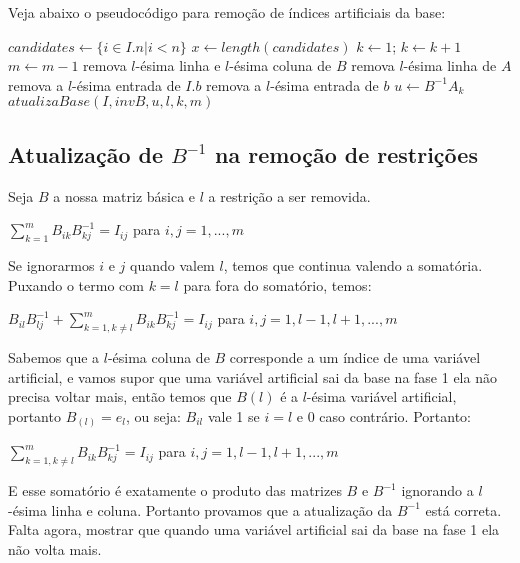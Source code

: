 \documentclass[12pt]{article}
\begin{document}
Veja abaixo o pseudocódigo para remoção de índices artificiais da base:
\bigskip

\begin{algorithmic}
		\State $candidates \gets \{i \in I.n | i< n\}$
		\State $x \gets length(candidates)$
		\State $k \gets 1$;
			\State $k \gets k + 1$
		\EndWhile
			\State $m \gets m - 1$
			\State remova $l$-ésima linha e $l$-ésima coluna de $B$
			\State remova $l$-ésima linha de $A$
			\State remova a $l$-ésima entrada de $I.b$
			\State remova a $l$-ésima entrada de $b$
		\Else
			\State $u \gets B^{-1}A_k$ 
			\State $atualizaBase(I, invB, u, l, k, m)$
		\EndIf 
	\EndFor
\EndFunction
\end{algorithmic}

\subsection{Atualização de $B^{-1}$ na remoção de restrições}
\label{fase1:rem_res_b_update}
Seja $B$ a nossa matriz básica e $l$ a restrição a ser removida.

\begin{center}
	$\sum_{k = 1}^{m} B_{ik} B^{-1}_{kj} = I_{ij}$ para $i, j = 1, ..., m$
\end{center}
Se ignorarmos $i$ e $j$ quando valem $l$, temos que continua valendo a somatória. Puxando o termo com $k = l$ para fora do somatório, temos:
\begin{center}
	$B_{il}B^{-1}_{lj} + \sum_{{k = 1, k \neq l}}^{m} B_{ik} B^{-1}_{kj} = I_{ij}$ para $i, j = 1, l-1, l+1, ..., m$
\end{center}

Sabemos que a $l$-ésima coluna de $B$ corresponde a um índice de uma variável artificial, e vamos supor que uma variável artificial sai da base na fase 1 ela não precisa voltar mais, então temos que $B(l)$ é a $l$-ésima variável artificial, portanto $B_(l) = e_l$, ou seja: $B_{il}$ vale 1 se $i = l$ e 0 caso contrário. Portanto:
\begin{center}
	$\sum_{{k = 1, k \neq l}}^{m} B_{ik} B^{-1}_{kj} = I_{ij}$ para $i, j = 1, l-1, l+1, ..., m$
\end{center}

E esse somatório é exatamente o produto das matrizes $B$ e $B^{-1}$ ignorando a $l$-ésima linha e coluna. Portanto provamos que a atualização da $B^{-1}$ está correta. Falta agora, mostrar que quando uma variável artificial sai da base na fase 1 ela não volta mais.
\end{document}

